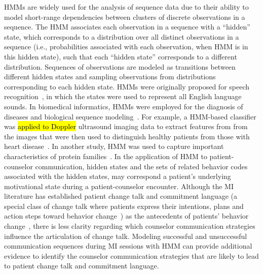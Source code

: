HMMs are widely used for the analysis of sequence data due to their ability to model short-range dependencies between clusters of discrete observations in a sequence. The HMM associates each observation in a sequence with a ``hidden'' state, which corresponds to a distribution over all distinct observations in a sequence (i.e., probabilities associated with each observation, when HMM is in this hidden state), such that each ``hidden state'' corresponds to a different distribution. Sequences of observations are modeled as transitions between different hidden states and sampling observations from distributions corresponding to each hidden state. HMMs were originally proposed for speech recognition~\cite{rabiner1989tutorial}, in which the states were used to represent all English language sounds. In biomedical informatics, HMMs were employed for the diagnosis of diseases and biological sequence modeling~\cite{uuguz2007biomedical, amrhein2003client}. For example, a HMM-based classifier was \hl{applied to Doppler} ultrasound imaging data to extract features from from the images that were then used to distinguish healthy patients from those with heart disease~\cite{uuguz2007biomedical}. In another study, HMM was used to capture important
characteristics of protein families~\cite{amrhein2003client}. In the application of HMM to patient-counselor communication, hidden states and the sets of related behavior codes associated with the hidden states, may correspond a patient’s underlying motivational state during a patient-counselor encounter. Although the MI literature has established patient change talk and commitment language (a special class of change talk where patients express their intentions, plans and action steps toward behavior change~\cite{baldi1994hidden}) as the antecedents of patients' behavior change~\cite{apodaca2009mechanisms}, there is less clarity regarding which counselor communication strategies influence the articulation of change talk. Modeling successful and unsuccessful communication sequences during MI sessions with HMM can provide additional evidence to identify the counselor communication strategies that are likely to lead to patient change talk and commitment language. 


